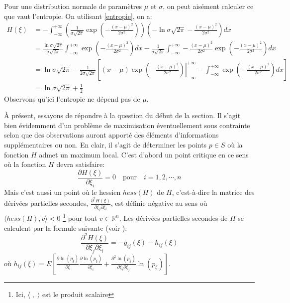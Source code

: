 \documentclass[11pt,french]{article}
\begin{document}
Pour une distribution normale de paramètres $\mu$ et $\sigma$, on peut aisément calculer ce que vaut l'entropie. On utilisant \eqref{entropie}, on a:
\begin{align*}
 H(\xi)&= -\int_{-\infty}^{+\infty}\left(\frac{1}{\sigma\sqrt{2\pi}}\exp\left(-\frac{(x-\mu)^2}{2\sigma^2}\right)\right)\left(-\ln\sigma\sqrt{2\pi}-\frac{(x-\mu)^2}{2\sigma^2}\right)dx\\
 &=\frac{\ln\sigma\sqrt{2\pi}}{\sigma\sqrt{2\pi}}\int_{-\infty}^{+\infty}\exp\left(-\frac{(x-\mu)^2}{2\sigma^2}\right)dx-\frac{1}{\sigma\sqrt{2\pi}}\int_{-\infty}^{+\infty}-\frac{(x-\mu)^2}{2\sigma^2}\exp\left(-\frac{(x-\mu)^2}{2\sigma^2}\right)dx\\
 &=\ln\sigma\sqrt{2\pi}-\frac{1}{2\sigma\sqrt{2\pi}}\left[\left.(x-\mu)\exp\left(-\frac{(x-\mu)^2}{2\sigma^2}\right)\right|_{-\infty}^{+\infty}-\int_{-\infty}^{+\infty}\exp\left(-\frac{(x-\mu)^2}{2\sigma^2}\right)dx\right]\\
 &=\ln\sigma\sqrt{2\pi}+\frac{1}{2}
\end{align*}
Observons qu'ici l'entropie ne dépend pas de $\mu$.
\newline

À présent, essayons de répondre à la question du début de la section. Il s'agit bien évidemment d'un problème de maximisation éventuellement sous contrainte selon que des observations auront apporté des éléments d'informations supplémentaires ou non. En clair, il s'agit de déterminer les points $p\in S$ où la fonction $H$ admet un maximum local. C'est d'abord un point critique en ce sens où la fonction $H$ devra satisfaire:
\begin{equation*}
    \frac{\partial H(\xi)}{\partial \xi_i}=0 \quad\text{pour}\quad i=1,2, \cdots, n
\end{equation*}
Mais c'est aussi un point où le hessien $hess(H)$ de $H$, c'est-à-dire la matrice des dérivées partielles secondes, $\frac{\partial^2 H(\xi)}{\partial \xi_j \partial\xi_ i}$, est définie négative au sens où $\langle hess(H), v \rangle<0$ \footnote{Ici, $\langle\;,\;\rangle$ est le produit scalaire} pour tout $v\in\mathbb{R}^n$. Les dérivées partielles secondes de $H$ se calculent par la formule suivante (voir \cite[Proposition 3.5.3]{calin2014geometric}):
\begin{equation}\label{entropie_metrique}
    \frac{\partial^2 H(\xi)}{\partial \xi_j \partial\xi_ i}=-g_{ij}(\xi)-h_{ij}(\xi)
\end{equation}
où $h_{ij}(\xi)=E\left[\frac{\partial\ln(p_{\xi})}{\partial\xi}\frac{\partial\ln(p_{\xi})}{\partial\xi_i}+\frac{\partial^2\ln(p_{\xi})}{\partial \xi_i \partial\xi_j}\ln(p_{\xi})\right]$.\\
\end{document}

